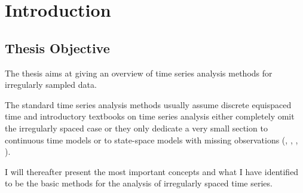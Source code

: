 \chapter{Introduction}\label{ch:introduction}


\section{Thesis Objective}\label{sec:thesis-objective}

The thesis aims at giving an overview of time series analysis methods for irregularly sampled data.

The standard time series analysis methods usually assume discrete equispaced time and introductory textbooks on
time series analysis either completely omit the irregularly spaced case or they only dedicate
a very small section to continuous time models or to state-space models
with missing observations (\citeauthor{brockwell_time_1991}, \citeauthor{brockwell_introduction_2016},
\citeauthor{cryer_time_2008}, \citeauthor{chatfield_analysis_2003}).

I will thereafter present the most important concepts and what I have identified to be the basic methods for
the analysis of irregularly spaced time series.

